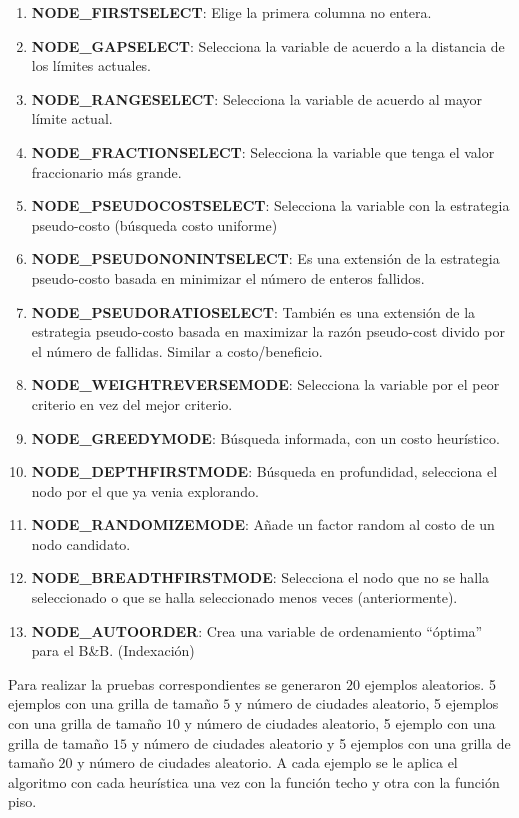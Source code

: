 \documentclass[a4paper,10pt]{article}
\begin{document}
\begin{enumerate}
 \item \textbf{NODE\_FIRSTSELECT}: Elige la primera columna no entera.%
 \item \textbf{NODE\_GAPSELECT}: Selecciona la variable de acuerdo a la distancia de los límites actuales.%
 \item \textbf{NODE\_RANGESELECT}: Selecciona la variable de acuerdo al mayor límite actual.%
 \item \textbf{NODE\_FRACTIONSELECT}: Selecciona la variable que tenga el valor fraccionario más grande.%
 \item \textbf{NODE\_PSEUDOCOSTSELECT}: Selecciona la variable con la estrategia pseudo-costo (búsqueda costo uniforme)%
 \item \textbf{NODE\_PSEUDONONINTSELECT}: Es una extensión de la estrategia pseudo-costo basada en minimizar el número de enteros fallidos.%
 \item \textbf{NODE\_PSEUDORATIOSELECT}: También es una extensión de la estrategia pseudo-costo basada en maximizar la razón pseudo-cost divido por el número de fallidas. Similar a costo/beneficio.%
 \item \textbf{NODE\_WEIGHTREVERSEMODE}: Selecciona la variable por el peor criterio en vez del mejor criterio.%
 \item \textbf{NODE\_GREEDYMODE}: Búsqueda informada, con un costo heurístico.%
 \item \textbf{NODE\_DEPTHFIRSTMODE}: Búsqueda en profundidad, selecciona el nodo por el que ya venia explorando.%
 \item \textbf{NODE\_RANDOMIZEMODE}: Añade un factor random al costo de un nodo candidato.%
 \item \textbf{NODE\_BREADTHFIRSTMODE}: Selecciona el nodo que no se halla seleccionado o que se halla seleccionado menos veces (anteriormente).%
 \item \textbf{NODE\_AUTOORDER}: Crea una variable de ordenamiento ``óptima'' para el B\&B. (Indexación)%
\end{enumerate}


Para realizar la pruebas correspondientes se generaron $20$ ejemplos aleatorios. 5 ejemplos con una grilla de tamaño $5$ y número de ciudades aleatorio, 5 ejemplos con una grilla
de tamaño $10$ y número de ciudades aleatorio, 5 ejemplo con una grilla de tamaño $15$ y número de ciudades aleatorio y 5 ejemplos con una grilla de tamaño $20$ y número de ciudades aleatorio.
A cada ejemplo se le aplica el algoritmo con cada heurística una vez con la función techo y otra con la función piso.\\
\end{document}
